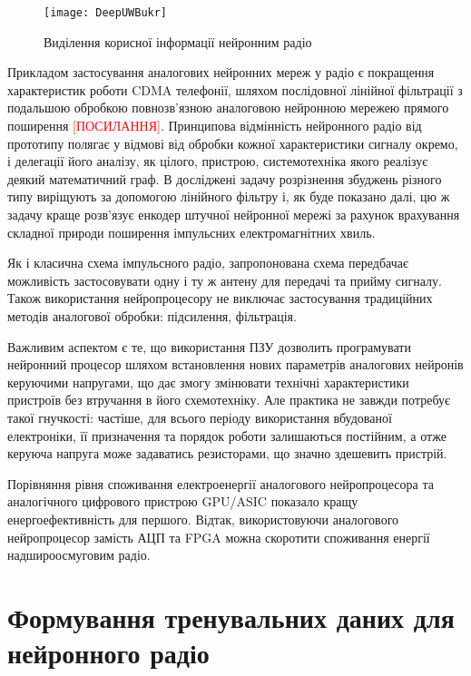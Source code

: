 \begin{figure}[htbp] \begin{center}
\texttt{[image: DeepUWBukr]}
\caption{Виділення корисної інформації нейронним радіо} 
\label{fig:DeepUWB}
\end{center} \end{figure}

Прикладом застосування аналогових нейронних мереж у радіо є покращення 
характеристик роботи CDMA телефонії, шляхом послідовної лінійної фільтрації
з подальшою обробкою повнозв'язною аналоговою нейронною мережею прямого 
поширення \textcolor{red}{[ПОСИЛАННЯ]}. Принципова відмінність нейронного
радіо від прототипу полягає у відмові від обробки кожної характеристики 
сигналу окремо, і делегації його аналізу, як цілого, пристрою, системотехніка 
якого реалізує деякий математичний граф. В досліджені \cite{imp:Zhang2009} 
задачу розрізнення збуджень різного типу виріщують за допомогою лінійного 
фільтру і, як буде показано далі, цю ж задачу краще розв'язує енкодер штучної 
нейронної мережі за рахунок врахування складної природи поширення імпульсних 
електромагнітних хвиль.

Як і класична схема імпульсного радіо, запропонована схема передбачає 
можливість застосовувати одну і ту ж антену для передачі та прийму сигналу. 
Також використання нейропроцесору не виключає застосування традиційних 
методів аналогової обробки: підсилення, фільтрація.

Важливим аспектом є те, що використання ПЗУ дозволить програмувати нейронний 
процесор шляхом встановлення нових параметрів аналогових нейронів керуючими 
напругами, що дає змогу змінювати технічні характеристики пристроїв без 
втручання в його схемотехніку. Але практика не завжди потребує такої 
гнучкості: частіше, для всього періоду використання вбудованої електроніки, 
її призначення та порядок роботи залишаються постійним, а отже керуюча 
напруга може задаватись резисторами, що значно здешевить пристрій.

Порівняння рівня споживання електроенергії аналогового нейропроцесора та 
аналогічного цифрового пристрою GPU/ASIC \cite{imp:AnalogLSTM} показало 
кращу енергоефективність для першого. Відтак, використовуючи аналогового 
нейропроцесор замість АЦП та FPGA можна скоротити споживання енергії 
надшироосмуговим радіо.

\section{Формування тренувальних даних для нейронного радіо}

